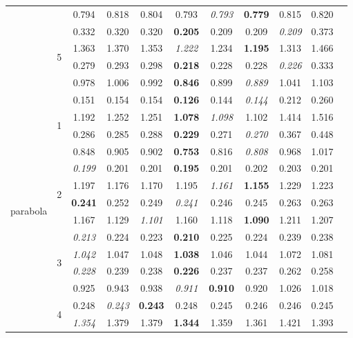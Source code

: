 \documentclass[authoryear, review, 11pt]{elsarticle}
\begin{document}
\begin{table}
\begin{center}
{\begin{tabular}{ccccccccccc}
   &  & 0.794 & 0.818 & 0.804 & 0.793 & \emph{0.793} & \textbf{0.779} & 0.815 & 0.820 \\ 
  \cline{3-10}
   & \multirow{4}{*}{5} & 0.332 & 0.320 & 0.320 & \textbf{0.205} & 0.209 & 0.209 & \emph{0.209} & 0.373 \\ 
   &  & 1.363 & 1.370 & 1.353 & \emph{1.222} & 1.234 & \textbf{1.195} & 1.313 & 1.466 \\ 
   &  & 0.279 & 0.293 & 0.298 & \textbf{0.218} & 0.228 & 0.228 & \emph{0.226} & 0.333 \\ 
   &  & 0.978 & 1.006 & 0.992 & \textbf{0.846} & 0.899 & \emph{0.889} & 1.041 & 1.103 \\ 
  \hline
  \multirow{20}{*}{parabola} & \multirow{4}{*}{1} & 0.151 & 0.154 & 0.154 & \textbf{0.126} & 0.144 & \emph{0.144} & 0.212 & 0.260 \\ 
   &  & 1.192 & 1.252 & 1.251 & \textbf{1.078} & \emph{1.098} & 1.102 & 1.414 & 1.516 \\ 
   &  & 0.286 & 0.285 & 0.288 & \textbf{0.229} & 0.271 & \emph{0.270} & 0.367 & 0.448 \\ 
   &  & 0.848 & 0.905 & 0.902 & \textbf{0.753} & 0.816 & \emph{0.808} & 0.968 & 1.017 \\ 
  \cline{3-10}
   & \multirow{4}{*}{2} & \emph{0.199} & 0.201 & 0.201 & \textbf{0.195} & 0.201 & 0.202 & 0.203 & 0.201 \\ 
   &  & 1.197 & 1.176 & 1.170 & 1.195 & \emph{1.161} & \textbf{1.155} & 1.229 & 1.223 \\ 
   &  & \textbf{0.241} & 0.252 & 0.249 & \emph{0.241} & 0.246 & 0.245 & 0.263 & 0.263 \\ 
   &  & 1.167 & 1.129 & \emph{1.101} & 1.160 & 1.118 & \textbf{1.090} & 1.211 & 1.207 \\ 
  \cline{3-10}
   & \multirow{4}{*}{3} & \emph{0.213} & 0.224 & 0.223 & \textbf{0.210} & 0.225 & 0.224 & 0.239 & 0.238 \\ 
   &  & \emph{1.042} & 1.047 & 1.048 & \textbf{1.038} & 1.046 & 1.044 & 1.072 & 1.081 \\ 
   &  & \emph{0.228} & 0.239 & 0.238 & \textbf{0.226} & 0.237 & 0.237 & 0.262 & 0.258 \\ 
   &  & 0.925 & 0.943 & 0.938 & \emph{0.911} & \textbf{0.910} & 0.920 & 1.026 & 1.018 \\ 
  \cline{3-10}
   & \multirow{4}{*}{4} & 0.248 & \emph{0.243} & \textbf{0.243} & 0.248 & 0.245 & 0.246 & 0.246 & 0.245 \\ 
   &  & \emph{1.354} & 1.379 & 1.379 & \textbf{1.344} & 1.359 & 1.361 & 1.421 & 1.393 \\ 

\end{tabular}}
\end{center}
\end{table}
\end{document}
